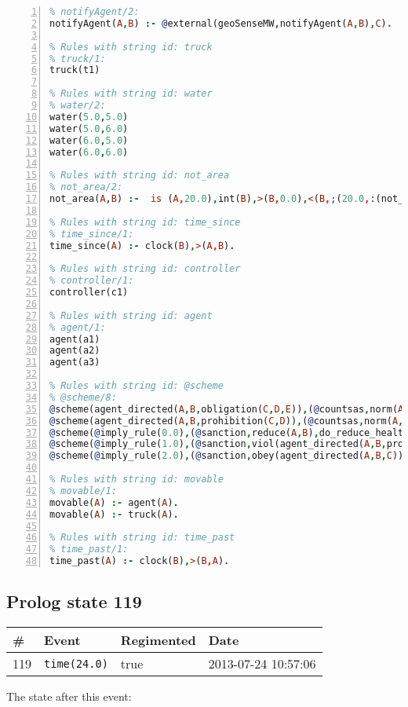 \documentclass[11pt]{article}\usepackage[utf8]{inputenc}\usepackage{geometry}
\begin{document}
\begin{lstlisting}[language=Prolog, numbers=left]
% Rules with string id: notifyAgent
% notifyAgent/2:
notifyAgent(A,B) :- @external(geoSenseMW,notifyAgent(A,B),C).

% Rules with string id: truck
% truck/1:
truck(t1)

% Rules with string id: water
% water/2:
water(5.0,5.0)
water(5.0,6.0)
water(6.0,5.0)
water(6.0,6.0)

% Rules with string id: not_area
% not_area/2:
not_area(A,B) :-  is (A,20.0),int(B),>(B,0.0),<(B,;(20.0,:(not_area(A,B), is (-(B),20.0)))),int(A),>(A,0.0),<(A,;(20.0,:(area(A,B),-(int(A))))),int(B),>(A,0.0),>(B,0.0),<(A,21.0),<(B,21.0).

% Rules with string id: time_since
% time_since/1:
time_since(A) :- clock(B),>(A,B).

% Rules with string id: controller
% controller/1:
controller(c1)

% Rules with string id: agent
% agent/1:
agent(a1)
agent(a2)
agent(a3)

% Rules with string id: @scheme
% @scheme/8:
@scheme(agent_directed(A,B,obligation(C,D,E)),(@countsas,norm(A,B,F,obligation(C,D,E)),F),false,(listTrue(C)),(time_past(D)),false,[plus(viol(agent_directed(A,B,obligation(C,D,E))))|[]],[plus(obey(agent_directed(A,B,obligation(C,D,E))))|[]])
@scheme(agent_directed(A,B,prohibition(C,D)),(@countsas,norm(A,B,E,prohibition(C,D)),E),(listTrue(C)),false,(false),false,[plus(viol(agent_directed(A,B,prohibition(C,D))))|[]],[plus(obey(agent_directed(A,B,prohibition(C,D))))|[]])
@scheme(@imply_rule(0.0),(@sanction,reduce(A,B),do_reduce_health(A,B),notifyAgent(A,changed(status))),true,false,false,false,[min(reduce(A,B))|[]],[])
@scheme(@imply_rule(1.0),(@sanction,viol(agent_directed(A,B,prohibition(C,D))),do_sanction(D)),true,false,false,false,[min(viol(agent_directed(A,B,prohibition(C,D))))|[]],[])
@scheme(@imply_rule(2.0),(@sanction,obey(agent_directed(A,B,C))),true,false,false,false,[min(obey(agent_directed(A,B,C)))|[]],[])

% Rules with string id: movable
% movable/1:
movable(A) :- agent(A).
movable(A) :- truck(A).

% Rules with string id: time_past
% time_past/1:
time_past(A) :- clock(B),>(B,A).

\end{lstlisting}
\clearpage 
\subsection{Prolog state 119}
\begin{table}[ht]
\centering 
\begin{tabular}{l l l l} 
\textbf{\#} & \textbf{Event} & \textbf{Regimented} & \textbf{Date} \\ [0.5ex] 
\hline
119&\texttt{time(24.0)}&true&2013-07-24 10:57:06\\ [1ex] \hline\end{tabular}
\end{table}
The state after this event:
\end{document}
